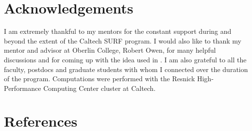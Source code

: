\documentclass{../document}
\begin{document}
  \section*{Acknowledgements}

    I am extremely thankful to my mentors for the constant support during and beyond the extent of the Caltech SURF program. I would also like to thank my mentor and advisor at Oberlin College, Robert Owen, for many helpful discussions and for coming up with the idea used in \eq{\eqref{eq:CoM-surf-1}}. I am also grateful to all the faculty, postdocs and graduate students with whom I connected over the duration of the program. Computations were
    performed with the Resnick High-Performance Computing Center cluster at Caltech.

  \section*{References}

	  \printbibliography[heading=none]
  
\end{document}
